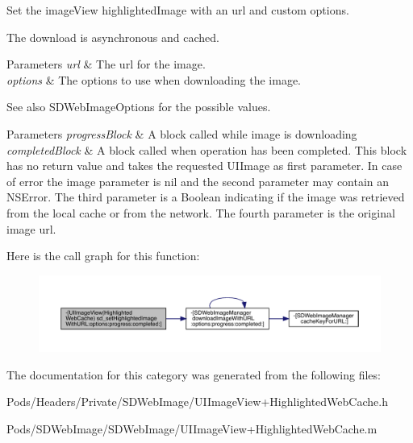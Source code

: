 Set the image\+View {\ttfamily highlighted\+Image} with an {\ttfamily url} and custom options.

The download is asynchronous and cached.


\begin{DoxyParams}{Parameters}
{\em url} & The url for the image. \\
\hline
{\em options} & The options to use when downloading the image. \\
\hline
\end{DoxyParams}
\begin{DoxySeeAlso}{See also}
S\+D\+Web\+Image\+Options for the possible values. 
\end{DoxySeeAlso}

\begin{DoxyParams}{Parameters}
{\em progress\+Block} & A block called while image is downloading \\
\hline
{\em completed\+Block} & A block called when operation has been completed. This block has no return value and takes the requested U\+I\+Image as first parameter. In case of error the image parameter is nil and the second parameter may contain an N\+S\+Error. The third parameter is a Boolean indicating if the image was retrieved from the local cache or from the network. The fourth parameter is the original image url. \\
\hline
\end{DoxyParams}
Here is the call graph for this function\+:\nopagebreak
\begin{figure}[H]
\begin{center}
\leavevmode
\includegraphics[width=350pt]{category_u_i_image_view_07_highlighted_web_cache_08_a06bdae01c3cfc17896de4b8d3c33702d_cgraph}
\end{center}
\end{figure}


The documentation for this category was generated from the following files\+:\begin{DoxyCompactItemize}
\item 
Pods/\+Headers/\+Private/\+S\+D\+Web\+Image/U\+I\+Image\+View+\+Highlighted\+Web\+Cache.\+h\item 
Pods/\+S\+D\+Web\+Image/\+S\+D\+Web\+Image/U\+I\+Image\+View+\+Highlighted\+Web\+Cache.\+m\end{DoxyCompactItemize}
